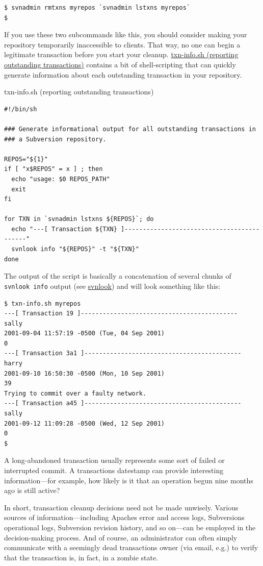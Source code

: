 \begin{verbatim}
$ svnadmin rmtxns myrepos `svnadmin lstxns myrepos`
$
\end{verbatim}

If you use these two subcommands like this, you should consider making
your repository temporarily inaccessible to clients. That way, no one
can begin a legitimate transaction before you start your cleanup.
\hyperref[svn.reposadmin.maint.diskspace.deadtxns.ex-1]{txn-info.sh
(reporting outstanding transactions)} contains a bit of shell-scripting
that can quickly generate information about each outstanding transaction
in your repository.

\protect{}\label{svn.reposadmin.maint.diskspace.deadtxns.ex-1}
txn-info.sh (reporting outstanding transactions)

\begin{verbatim}
#!/bin/sh

### Generate informational output for all outstanding transactions in
### a Subversion repository.

REPOS="${1}"
if [ "x$REPOS" = x ] ; then
  echo "usage: $0 REPOS_PATH"
  exit
fi

for TXN in `svnadmin lstxns ${REPOS}`; do 
  echo "---[ Transaction ${TXN} ]-------------------------------------------"
  svnlook info "${REPOS}" -t "${TXN}"
done
\end{verbatim}

The output of the script is basically a concatenation of several chunks
of \texttt{svnlook\ info} output (see
\hyperref[svn.reposadmin.maint.tk.svnlook]{svnlook}) and will look
something like this:

\begin{verbatim}
$ txn-info.sh myrepos
---[ Transaction 19 ]-------------------------------------------
sally
2001-09-04 11:57:19 -0500 (Tue, 04 Sep 2001)
0
---[ Transaction 3a1 ]-------------------------------------------
harry
2001-09-10 16:50:30 -0500 (Mon, 10 Sep 2001)
39
Trying to commit over a faulty network.
---[ Transaction a45 ]-------------------------------------------
sally
2001-09-12 11:09:28 -0500 (Wed, 12 Sep 2001)
0
$
\end{verbatim}

A long-abandoned transaction usually represents some sort of failed or
interrupted commit. A transaction\textquotesingle s datestamp can
provide interesting information---for example, how likely is it that an
operation begun nine months ago is still active?

In short, transaction cleanup decisions need not be made unwisely.
Various sources of information---including Apache\textquotesingle s
error and access logs, Subversion\textquotesingle s operational logs,
Subversion revision history, and so on---can be employed in the
decision-making process. And of course, an administrator can often
simply communicate with a seemingly dead transaction\textquotesingle s
owner (via email, e.g.) to verify that the transaction is, in fact, in a
zombie state.

